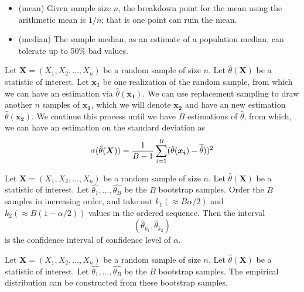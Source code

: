 \begin{refsection}
\begin{example}\hfill
\begin{itemize}
	\item (mean) Given sample size $n$, the breakdown point for the mean using the arithmetic mean is $1/n$; that is one point can ruin the mean.
	\item (median) The sample median, as an estimate of a population median, can tolerate up to 50\% bad values.
\end{itemize}	
\end{example}

\begin{lemma}
\end{lemma}

\begin{definition}
	Let $\bm{X} = (X_1,X_2,...,X_n)$ be a random sample of size $n$. Let $\hat{\theta}(\bm{X})$ be a statistic of interest. Let $\bm{x_1}$ be one realization of the random sample, from which we can have an estimation via $\hat{\theta}(\bm{x_1})$. We can use replacement sampling to draw another $n$ samples of $\bm{x_1}$, which we will denote $\bm{x_2}$ and have an new estimation $\hat{\theta}(\bm{x_2})$. We continue this process until we have $B$ estimations of $\hat{\theta}$, from which, we can have an estimation on the standard deviation as
	$$\sigma(\hat{\theta}(\bm{X})) = \frac{1}{B-1}\sum_{i=1}^B (\hat{\theta}(\bm{x_i}) - \overline{\hat{\theta}}))^2$$
\end{definition}



\begin{definition}
	Let $\bm{X} = (X_1,X_2,...,X_n)$ be a random sample of size $n$. Let $\hat{\theta}(\bm{X})$ be a statistic of interest. Let $\hat{\theta_1},...,\hat{\theta_B}$ be the $B$ bootstrap samples. Order the $B$ samples in increasing order, and take out $k_1( \approx B\alpha/2)$ and $k_2(\approx B(1-\alpha/2))$ values in the ordered sequence. Then the interval
	$$(\hat{\theta}_{k_1},\hat{\theta}_{k_2})$$
	is the confidence interval of confidence level of $\alpha$.
\end{definition}


\begin{definition}
	Let $\bm{X} = (X_1,X_2,...,X_n)$ be a random sample of size $n$. Let $\hat{\theta}(\bm{X})$ be a statistic of interest. Let $\hat{\theta_1},...,\hat{\theta_B}$ be the $B$ bootstrap samples. The empirical distribution can be constructed from these bootstrap samples. 
\end{definition}


\end{refsection}
